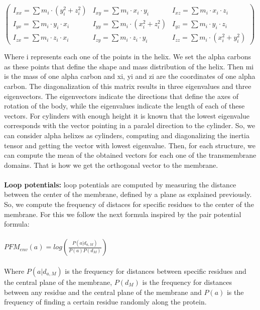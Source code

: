 \documentclass[12pt,titlepage]{article}
\theoremstyle{supercalifragilisticexpialidocious}
\begin{document}
\begin{center}
$\begin{pmatrix}
I_{xx} = \sum m_i \cdot (y_{i}^{2} + z_{i}^{2}) & I_{xy} = \sum m_i \cdot x_{i} \cdot y_{i} & I_{xz} = \sum m_i \cdot x_{i} \cdot z_{i} \\ 
I_{yx} = \sum m_i \cdot y_{i} \cdot x_{i} & I_{yy} = \sum m_i \cdot (x_{i}^{2} + z_{i}^{2}) & I_{yz} = \sum m_i \cdot y_{i} \cdot z_{i} \\
I_{zx} = \sum m_i \cdot z_{i} \cdot x_{i} & I_{zy} = \sum m_i \cdot z_{i} \cdot y_{i} & I_{zz} = \sum m_i \cdot (x_{i}^{2} + y_{i}^{2})
\end{pmatrix}$
\end{center}

Where i represents each one of the points in the helix. We set the alpha carbons as these points that define the shape and mass distribution of the helix. Then mi is the mass of one alpha carbon and xi, yi and zi are the coordinates of one alpha carbon. The diagonalization of this matrix results in three eigenvalues and three eigenvectors. The eigenvectors indicate the directions that define the axes of rotation of the body, while the eigenvalues indicate the length of each of these vectors. For cylinders with enough height it is known that the lowest eigenvalue corresponds with the vector pointing in a paralel direction to the cylinder. So, we can consider alpha helixes as cylinders, computing and diagonalizing the inertia tensor and getting the vector with lowest eigenvalue. Then, for each structure, we can compute the mean of the obtained vectors for each one of the transmembrane domains. That is how we get the orthogonal vector to the membrane.
\\ \\
\textbf{Loop potentials: } loop potentials are computed by measuring the distance between the center of the membrane, defined by a plane as explained previously. So, we compute the frequency of distaces for specific residues to the center of the membrane. For this we follow the next formula inspired by the pair potential formula:
\\ \\
$PFM_{env}(a) = log(\frac{P(a|d_{a,M})}{P(a)P(d_M)})
$
\\ \\
Where $P(a|d_{a,M})$ is the frequency for distances between specific residues and the central plane of the membrane, $P(d_M)$ is the frequency for distances between any residue and the central plane of the membrane and $P(a)$ is the frequency of finding a certain residue randomly along the protein.
\end{document}
